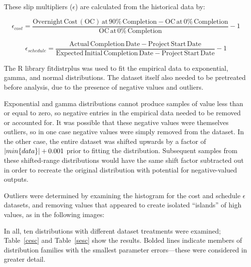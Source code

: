 \documentclass{article}
\DeclarePairedDelimiter\abs{\lvert}{\rvert}
\begin{document}
These slip multipliers ($\epsilon$) are calculated from the historical data by:

\begin{adjustwidth}{-1.5cm}{-1.5cm}
\begin{equation}
  \epsilon_{cost} = \frac{\mathrm{Overnight\, Cost\, (OC)\, at\, 90\%\, Completion} - \mathrm{OC\, at\, 0\%\, Completion}}{\mathrm{OC\, at\, 0\%\, Completion}} - 1
\end{equation}
\end{adjustwidth}

\begin{equation}
  \epsilon_{schedule} = \frac{\mathrm{Actual \, Completion \, Date} - \mathrm{Project \, Start \, Date}}{\mathrm{Expected \, Initial \, Completion \, Date} - \mathrm{Project \, Start \, Date}} - 1
\end{equation}

The R library $\mathrm{fitdistrplus}$ was used to fit the empirical data to exponential, gamma, and normal distributions.
The dataset itself also needed to be pretreated before analysis, due to the presence of negative values and outliers.

Exponential and gamma distributions cannot produce samples of value less than or equal to zero, so negative entries in the empirical data needed to be removed or accounted for.
It was possible that these negative values were themselves outliers, so in one case negative values were simply removed from the dataset.
In the other case, the entire dataset was shifted upwards by a factor of $\abs{min\{data\}} + 0.001$ prior to fitting the distribution.
Subsequent samples from these shifted-range distributions would have the same shift factor subtracted out in order to recreate the original distribution with potential for negative-valued outputs.

Outliers were determined by examining the histogram for the cost and schedule $\epsilon$ datasets, and removing values that appeared to create isolated ``islands'' of high values, as in the following images:

\begin{centering}
\end{centering}

In all, ten distributions with different dataset treatments were examined; Table~\ref{cesc} and Table~\ref{sesc}  show the results.
Bolded lines indicate members of distribution families with the smallest parameter errors---these were considered in greater detail.
\end{document}
